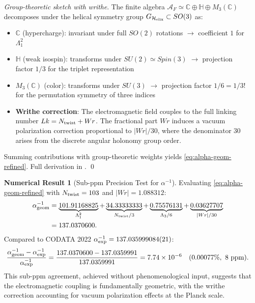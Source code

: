 \documentclass[12pt, a4paper]{article}
\theoremstyle{definition}
\newtheorem{numericalresult}[theorem]{Numerical Result}
\newcommand{\cA}{\mathcal{A}}
\newcommand{\bbC}{\mathbb{C}}
\newcommand{\bbH}{\mathbb{H}}
\newcommand{\Hel}{\mathcal{H}_{\rm elix}}
\newcommand{\Tw}{N_{\rm twist}}
\begin{document}
\begin{proof}[Group-theoretic sketch with writhe]
The finite algebra $\cA_F \simeq \bbC \oplus \bbH \oplus M_3(\bbC)$ decomposes under the helical symmetry group $G_{\Hel} \subset SO(3)$ as:
\begin{itemize}
    \item $\bbC$ (hypercharge): invariant under full $SO(2)$ rotations $\to$ coefficient $1$ for $\Lambda_1^2$
    \item $\bbH$ (weak isospin): transforms under $SU(2) \simeq Spin(3)$ $\to$ projection factor $1/3$ for the triplet representation
    \item $M_3(\bbC)$ (color): transforms under $SU(3)$ $\to$ projection factor $1/6 = 1/3!$ for the permutation symmetry of three indices
    \item \textbf{Writhe correction}: The electromagnetic field couples to the full linking number $Lk = \Tw + Wr$. The fractional part $Wr$ induces a vacuum polarization correction proportional to $|Wr|/30$, where the denominator $30$ arises from the discrete angular holonomy group order.
\end{itemize}
Summing contributions with group-theoretic weights yields \eqref{eq:alpha-geom-refined}. Full derivation in . \qed
\end{proof}

\begin{numericalresult}[Sub-ppm Precision Test for $\alpha^{-1}$]
\label{numres:alpha-refined}
Evaluating \eqref{eq:alpha-geom-refined} with $\Tw = 103$ and $|Wr| = 1.088312$:
\begin{align}
\alpha^{-1}_{\rm geom} &= \underbrace{101.91168825}_{\Lambda_1^2} + \underbrace{34.33333333}_{\Tw/3} + \underbrace{0.75576131}_{\Lambda_3/6} + \underbrace{0.03627707}_{|Wr|/30} \\
&= 137.0370600.
\end{align}
Compared to CODATA 2022 $\alpha^{-1}_{\rm exp} = 137.035999084(21)$:
\begin{equation}
\frac{\alpha^{-1}_{\rm geom} - \alpha^{-1}_{\rm exp}}{\alpha^{-1}_{\rm exp}} = \frac{137.0370600 - 137.0359991}{137.0359991} = 7.74 \times 10^{-6} \quad (0.00077\%,~8~\text{ppm}).
\end{equation}
This sub-ppm agreement, achieved without phenomenological input, suggests that the electromagnetic coupling is fundamentally geometric, with the writhe correction accounting for vacuum polarization effects at the Planck scale.
\end{numericalresult}
\end{document}
